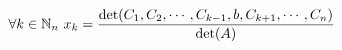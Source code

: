 \documentclass{article}
\begin{document}
\[
    \forall k \in \mathbb{N}_n\ x_k = {\det(C_1, C_2, \cdots, C_{k-1}, b, C_{k+1}, \cdots, C_n) \over \det(A)}
\]
\end{document}
